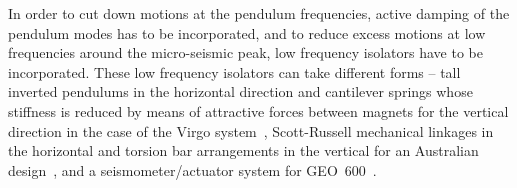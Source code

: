 \documentclass{article}
\begin{document}

In order to cut down motions at the pendulum frequencies, active
damping of the pendulum modes has to be incorporated, and to reduce
excess motions at low frequencies around the micro-seismic peak, low
frequency isolators have to be incorporated. These low frequency
isolators can take different forms -- tall inverted pendulums in the
horizontal direction and cantilever springs whose stiffness is reduced
by means of attractive forces between magnets for the vertical
direction in the case of the Virgo system~\cite{Losurdo},
Scott-Russell mechanical linkages in the horizontal and torsion bar
arrangements in the vertical for an Australian
design~\cite{Winterflood}, and a seismometer/actuator system for
GEO~600~\cite{Plissi2}.
\end{document}
